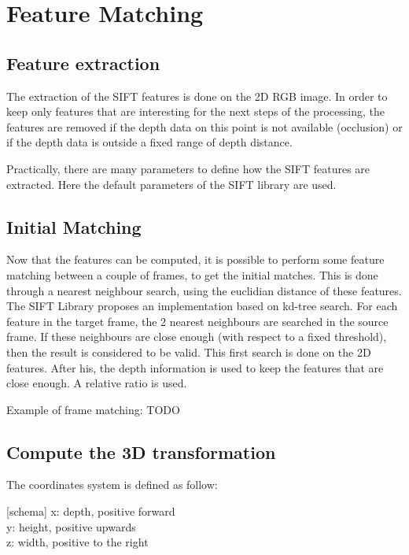 \chapter{Feature Matching}

\section{Feature extraction}

The extraction of the SIFT features is done on the 2D RGB image. In order to keep only features that are interesting for the next steps of the processing, the features are removed if the depth data on this point is not available (occlusion) or if the depth data is outside a fixed range of depth distance.

Practically, there are many parameters to define how the SIFT features are extracted. Here the default parameters of the SIFT library are used.

\section{Initial Matching}

Now that the features can be computed, it is possible to perform some feature matching between a couple of frames, to get the initial matches. This is done through a nearest neighbour search, using the euclidian distance of these features.  
The SIFT Library proposes an implementation based on kd-tree search. For each feature in the target frame, the 2 nearest neighbours are searched in the source frame. If these neighbours are close enough (with respect to a fixed threshold), then the result is considered to be valid. This first search is done on the 2D features.
After his, the depth information is used to keep the features that are close enough. A relative ratio is used.

Example of frame matching: TODO

\section{Compute the 3D transformation}

The coordinates system is defined as follow:

[schema]
x: depth, positive forward\\
y: height, positive upwards\\
z: width, positive to the right\\

